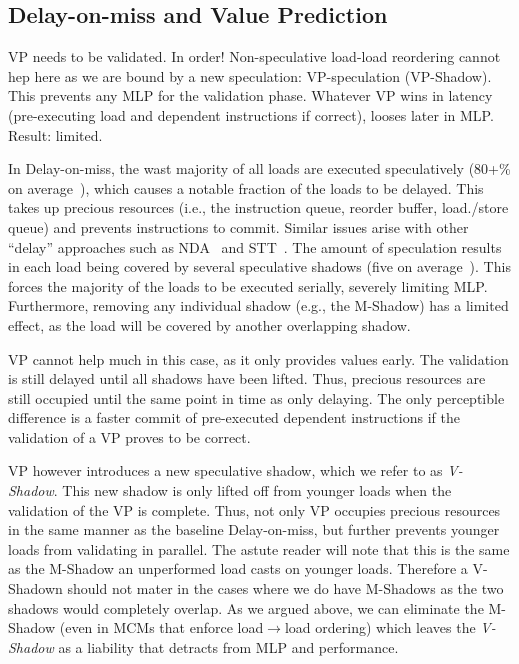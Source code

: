\subsection{Delay-on-miss and Value Prediction} 

VP needs to be validated. In order! Non-speculative load-load reordering cannot hep here as we are bound by a new speculation: VP-speculation (VP-Shadow). This prevents any MLP for the validation phase. Whatever VP wins in latency (pre-executing load and dependent instructions if correct), looses later in MLP. Result: limited.

In Delay-on-miss, the wast majority of all loads are executed speculatively (80+\% on average~\cite{}), which causes a notable fraction of the loads to be delayed. This takes up precious resources (i.e., the instruction queue, reorder buffer, load./store queue) and prevents instructions to commit. Similar issues arise with other ``delay'' approaches such as NDA~\cite{} and STT~\cite{}.
The amount of speculation results in each load being covered by several speculative shadows (five on average~\cite{}). This forces the majority of the loads to be executed serially, severely limiting MLP. Furthermore, removing any individual shadow (e.g., the M-Shadow) has a limited effect, as the load will be covered by another overlapping shadow.

VP cannot help much in this case, as it only provides values early. The validation is still delayed until all shadows have been lifted. Thus, precious resources are still occupied until the same point in time as only delaying.
The only perceptible difference is a faster commit of pre-executed dependent instructions if the validation of a VP proves to be correct.

VP however introduces a new speculative shadow, which we refer to as \emph{V-Shadow}. This new shadow is only lifted off from younger loads when the validation of the VP is complete. Thus, not only VP occupies precious resources in the same manner as the baseline Delay-on-miss, but further prevents younger loads from validating in parallel. The astute reader will note that this is the same as the M-Shadow an unperformed load casts on younger loads. Therefore a V-Shadown should not mater in the cases where we do have M-Shadows as the two shadows would completely overlap. As we argued above, we can eliminate the M-Shadow (even in MCMs that enforce load$\rightarrow$load ordering) which leaves the \emph{V-Shadow} as a liability that detracts from MLP and performance.

